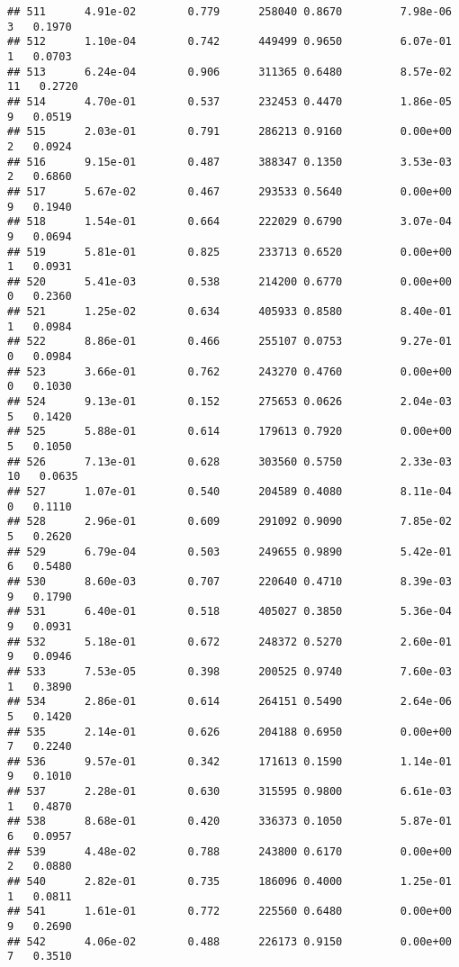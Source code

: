\documentclass[
]{article}
\begin{document}
\begin{verbatim}
## 511      4.91e-02        0.779      258040 0.8670         7.98e-06   3   0.1970
## 512      1.10e-04        0.742      449499 0.9650         6.07e-01   1   0.0703
## 513      6.24e-04        0.906      311365 0.6480         8.57e-02  11   0.2720
## 514      4.70e-01        0.537      232453 0.4470         1.86e-05   9   0.0519
## 515      2.03e-01        0.791      286213 0.9160         0.00e+00   2   0.0924
## 516      9.15e-01        0.487      388347 0.1350         3.53e-03   2   0.6860
## 517      5.67e-02        0.467      293533 0.5640         0.00e+00   9   0.1940
## 518      1.54e-01        0.664      222029 0.6790         3.07e-04   9   0.0694
## 519      5.81e-01        0.825      233713 0.6520         0.00e+00   1   0.0931
## 520      5.41e-03        0.538      214200 0.6770         0.00e+00   0   0.2360
## 521      1.25e-02        0.634      405933 0.8580         8.40e-01   1   0.0984
## 522      8.86e-01        0.466      255107 0.0753         9.27e-01   0   0.0984
## 523      3.66e-01        0.762      243270 0.4760         0.00e+00   0   0.1030
## 524      9.13e-01        0.152      275653 0.0626         2.04e-03   5   0.1420
## 525      5.88e-01        0.614      179613 0.7920         0.00e+00   5   0.1050
## 526      7.13e-01        0.628      303560 0.5750         2.33e-03  10   0.0635
## 527      1.07e-01        0.540      204589 0.4080         8.11e-04   0   0.1110
## 528      2.96e-01        0.609      291092 0.9090         7.85e-02   5   0.2620
## 529      6.79e-04        0.503      249655 0.9890         5.42e-01   6   0.5480
## 530      8.60e-03        0.707      220640 0.4710         8.39e-03   9   0.1790
## 531      6.40e-01        0.518      405027 0.3850         5.36e-04   9   0.0931
## 532      5.18e-01        0.672      248372 0.5270         2.60e-01   9   0.0946
## 533      7.53e-05        0.398      200525 0.9740         7.60e-03   1   0.3890
## 534      2.86e-01        0.614      264151 0.5490         2.64e-06   5   0.1420
## 535      2.14e-01        0.626      204188 0.6950         0.00e+00   7   0.2240
## 536      9.57e-01        0.342      171613 0.1590         1.14e-01   9   0.1010
## 537      2.28e-01        0.630      315595 0.9800         6.61e-03   1   0.4870
## 538      8.68e-01        0.420      336373 0.1050         5.87e-01   6   0.0957
## 539      4.48e-02        0.788      243800 0.6170         0.00e+00   2   0.0880
## 540      2.82e-01        0.735      186096 0.4000         1.25e-01   1   0.0811
## 541      1.61e-01        0.772      225560 0.6480         0.00e+00   9   0.2690
## 542      4.06e-02        0.488      226173 0.9150         0.00e+00   7   0.3510

\end{verbatim}
\end{document}
